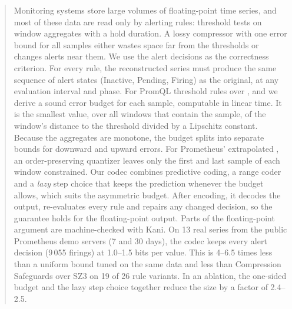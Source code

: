 \begin{abstract}
Monitoring systems store large volumes of floating-point time series, and
most of these data are read only by alerting rules: threshold tests on
window aggregates with a hold duration. A lossy compressor with one error
bound for all samples either wastes space far from the thresholds or
changes alerts near them. We use the alert decisions as the correctness
criterion. For every rule, the reconstructed series must produce the same
sequence of alert states (\textsf{Inactive}, \textsf{Pending},
\textsf{Firing}) as the original, at any evaluation interval and phase.
For PromQL threshold rules over ,
 and  we derive a sound error
budget for each sample, computable in linear time. It is the smallest
value, over all windows that contain the sample, of the window's distance
to the threshold divided by a Lipschitz constant. Because the aggregates
are monotone, the budget splits into separate bounds for downward and
upward errors. For Prometheus' extrapolated , an
order-preserving quantizer leaves only the first and last sample of each
window constrained. Our codec combines predictive coding, a range coder and
a \emph{lazy} step choice that keeps the prediction whenever the budget
allows, which suits the asymmetric budget. After encoding, it decodes the
output, re-evaluates every rule and repairs any changed decision, so the
guarantee holds for the floating-point output. Parts of the
floating-point argument are machine-checked with Kani. On 13 real series
from the public Prometheus demo servers (7 and 30 days), the codec keeps
every alert decision (9\,055 firings) at 1.0--1.5 bits per value. This is
4--6.5 times less than a uniform bound tuned on the same data and less
than Compression Safeguards over SZ3 on 19 of 26 rule variants. In an
ablation, the one-sided budget and the lazy step choice together reduce
the size by a factor of 2.4--2.5.
\end{abstract}
